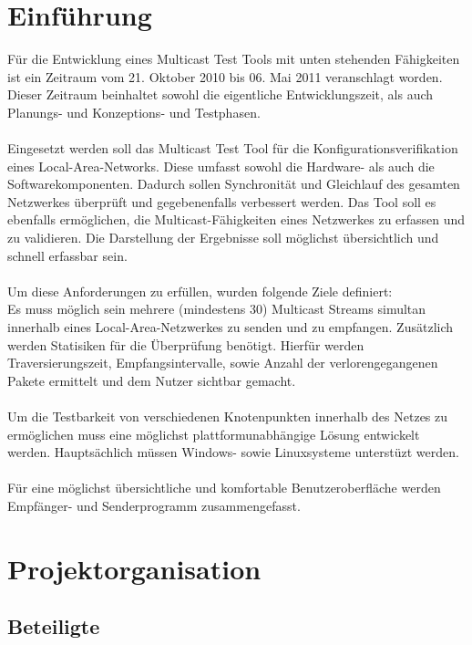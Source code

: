 
\chapter{Einführung}
\label{cha:einf}

Für die Entwicklung eines Multicast Test Tools mit unten stehenden Fähigkeiten
ist ein Zeitraum vom 21. Oktober 2010 bis 06. Mai 2011 veranschlagt worden. Dieser Zeitraum beinhaltet sowohl die eigentliche
Entwicklungszeit, als auch Planungs- und Konzeptions- und Testphasen.\\
\\
Eingesetzt werden soll das Multicast Test Tool für die Konfigurationsverifikation
eines Local-Area-Networks. Diese umfasst sowohl die Hardware- als auch die
Softwarekomponenten. Dadurch sollen Synchronität und Gleichlauf des gesamten
Netzwerkes überprüft und gegebenenfalls verbessert werden. Das Tool soll es ebenfalls ermöglichen, die Multicast-Fähigkeiten eines
Netzwerkes zu erfassen und zu validieren. Die Darstellung der Ergebnisse soll
möglichst übersichtlich und schnell erfassbar sein.\\
\\

Um diese Anforderungen zu erfüllen, wurden folgende Ziele definiert:\\
Es muss möglich sein mehrere (mindestens 30) Multicast Streams simultan
innerhalb eines Local-Area-Netzwerkes zu senden und zu empfangen. Zusätzlich
werden Statisiken für die Überprüfung benötigt. Hierfür werden Traversierungszeit,
Empfangsintervalle, sowie Anzahl der verlorengegangenen Pakete ermittelt und dem
Nutzer sichtbar gemacht.\\
\\
Um die Testbarkeit von verschiedenen Knotenpunkten innerhalb des Netzes zu
ermöglichen muss eine möglichst plattformunabhängige Lösung entwickelt werden. Hauptsächlich müssen Windows- 
sowie Linuxsysteme unterstüzt werden. \\
\\
Für eine möglichst übersichtliche und komfortable Benutzeroberfläche werden
Empfänger- und Senderprogramm zusammengefasst. 

\chapter{Projektorganisation}
\label{cha:proo}

\section{Beteiligte}

